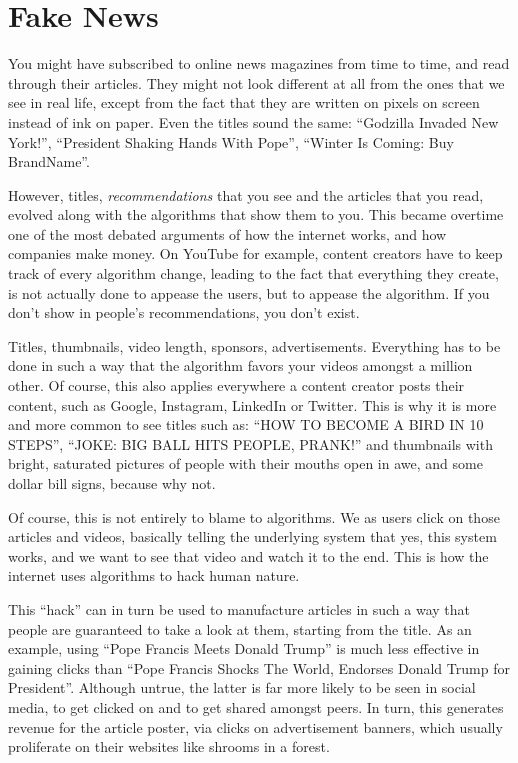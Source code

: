 \section{Fake News}

You might have subscribed to online news magazines from time to time, and read through their articles. They might not look different at all from the ones that we see in real life, except from the fact that they are written on pixels on screen instead of ink on paper. Even the titles sound the same: ``Godzilla Invaded New York!'', ``President Shaking Hands With Pope'', ``Winter Is Coming: Buy BrandName''.

However, titles, \textit{recommendations} that you see and the articles that you read, evolved along with the algorithms that show them to you. This became overtime one of the most debated arguments of how the internet works, and how companies make money. On YouTube for example, content creators have to keep track of every algorithm change, leading to the fact that everything they create, is not actually done to appease the users, but to appease the algorithm. If you don't show in people's recommendations, you don't exist.

Titles, thumbnails, video length, sponsors, advertisements. Everything has to be done in such a way that the algorithm favors your videos amongst a million other. Of course, this also applies everywhere a content creator posts their content, such as Google, Instagram, LinkedIn or Twitter. This is why it is more and more common to see titles such as: ``HOW TO BECOME A BIRD IN 10 STEPS'', ``JOKE: BIG BALL HITS PEOPLE, PRANK!'' and thumbnails with bright, saturated pictures of people with their mouths open in awe, and some dollar bill signs, because why not.

Of course, this is not entirely to blame to algorithms. We as users click on those articles and videos, basically telling the underlying system that yes, this system works, and we want to see that video and watch it to the end. This is how the internet uses algorithms to hack human nature.

This ``hack'' can in turn be used to manufacture articles in such a way that people are guaranteed to take a look at them, starting from the title. As an example, using ``Pope Francis Meets Donald Trump'' is much less effective in gaining clicks than ``Pope Francis Shocks The World, Endorses Donald Trump for President''. Although untrue, the latter is far more likely to be seen in social media, to get clicked on and to get shared amongst peers. In turn, this generates revenue for the article poster, via clicks on advertisement banners, which usually proliferate on their websites like shrooms in a forest.

